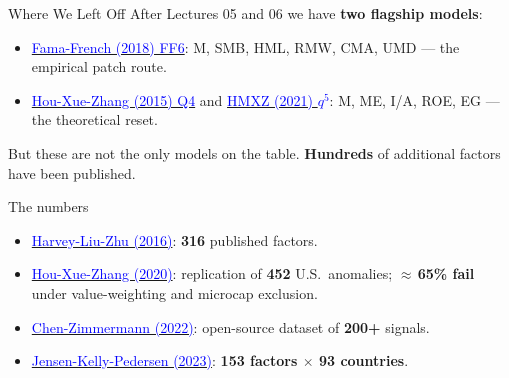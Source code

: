 \documentclass{beamer}
\begin{document}
\begin{frame}{Where We Left Off}
	After Lectures 05 and 06 we have \textbf{two flagship models}:
	\begin{itemize}
		\item \href{https://doi.org/10.1016/j.jfineco.2018.02.012}{\textcolor{blue}{Fama-French (2018) FF6}}: M, SMB, HML, RMW, CMA, UMD --- the empirical patch route.
		\item \href{https://doi.org/10.1093/rfs/hhu068}{\textcolor{blue}{Hou-Xue-Zhang (2015) Q4}} and \href{https://doi.org/10.1093/rof/rfaa004}{\textcolor{blue}{HMXZ (2021) $q^5$}}: M, ME, I/A, ROE, EG --- the theoretical reset.
	\end{itemize}
	\vspace{4pt}
	But these are not the only models on the table. \textbf{Hundreds} of additional factors have been published.
	\vspace{4pt}
	\begin{block}{The numbers}
		\begin{itemize}
			\item \href{https://doi.org/10.1093/rfs/hhv059}{\textcolor{blue}{Harvey-Liu-Zhu (2016)}}: \textbf{316} published factors.
			\item \href{https://doi.org/10.1093/rfs/hhy131}{\textcolor{blue}{Hou-Xue-Zhang (2020)}}: replication of \textbf{452} U.S.\ anomalies; \textbf{$\approx$\,65\% fail} under value-weighting and microcap exclusion.
			\item \href{https://doi.org/10.1561/104.00000112}{\textcolor{blue}{Chen-Zimmermann (2022)}}: open-source dataset of \textbf{200+} signals.
			\item \href{https://doi.org/10.1111/jofi.13249}{\textcolor{blue}{Jensen-Kelly-Pedersen (2023)}}: \textbf{153 factors $\times$ 93 countries}.
		\end{itemize}
	\end{block}
\end{frame}
\end{document}
